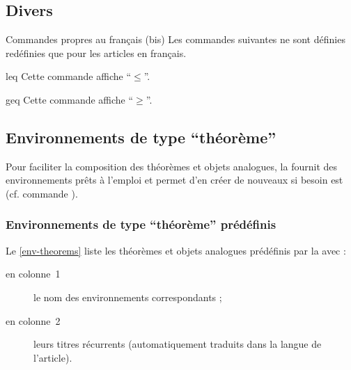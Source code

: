 \documentclass[french,nolocaltoc]{nwejmart}
\newtheorem[title=Fait,style=definition]{fact}
\begin{document}
\subsection{Divers}

\begin{dbremark}{Commandes propres au français (bis)}{}
  Les commandes suivantes ne sont définies redéfinies que pour les articles en
  français.
\end{dbremark}

\begin{docCommand}{leq}{}
  Cette commande affiche \enquote{$\leq$}.
\end{docCommand}
\begin{docCommand}{geq}{}
  Cette commande affiche \enquote{$\geq$}.
\end{docCommand}

\subsection{Environnements de type \enquote{théorème}}

Pour faciliter la composition des théorèmes et objets analogues, la
\nwejmauthorcl{} fournit des environnements prêts à l'emploi et permet d'en
créer de nouveaux si besoin est (cf. commande ).

\subsubsection{Environnements de type \enquote{théorème} prédéfinis}
\label{sec:envir-de-type}

Le \vref{env-theorems} liste les théorèmes et objets analogues prédéfinis par la
\nwejmauthorcl{} avec :
\begin{description}
\item[en colonne~1] le nom des environnements correspondants ;
\item[en colonne~2] leurs titres récurrents (automatiquement traduits dans la
  langue de l'article).
\end{description}
\end{document}
